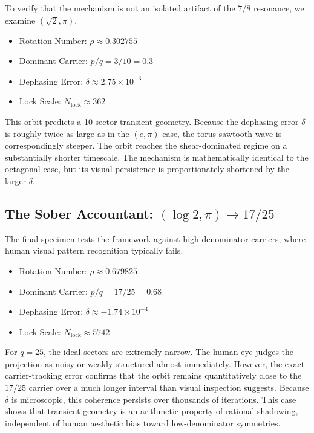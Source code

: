\documentclass[11pt]{article}
\begin{document}
To verify that the mechanism is not an isolated artifact of the $7/8$ resonance, we examine $(\sqrt{2},\pi)$.
\begin{itemize}
    \item Rotation Number: $\rho \approx 0.302755$
    \item Dominant Carrier: $p/q = 3/10 = 0.3$
    \item Dephasing Error: $\delta \approx 2.75\times 10^{-3}$
    \item Lock Scale: $N_{\mathrm{lock}} \approx 362$
\end{itemize}

This orbit predicts a 10-sector transient geometry. Because the dephasing error $\delta$ is roughly twice as large as in the $(e,\pi)$ case, the torus-sawtooth wave is correspondingly steeper. The orbit reaches the shear-dominated regime on a substantially shorter timescale. The mechanism is mathematically identical to the octagonal case, but its visual persistence is proportionately shortened by the larger $\delta$.

\subsection{The Sober Accountant: $(\log 2,\pi)\to 17/25$}

The final specimen tests the framework against high-denominator carriers, where human visual pattern recognition typically fails.
\begin{itemize}
    \item Rotation Number: $\rho \approx 0.679825$
    \item Dominant Carrier: $p/q = 17/25 = 0.68$
    \item Dephasing Error: $\delta \approx -1.74\times 10^{-4}$
    \item Lock Scale: $N_{\mathrm{lock}} \approx 5742$
\end{itemize}

For $q=25$, the ideal sectors are extremely narrow. The human eye judges the projection as noisy or weakly structured almost immediately. However, the exact carrier-tracking error confirms that the orbit remains quantitatively close to the $17/25$ carrier over a much longer interval than visual inspection suggests. Because $\delta$ is microscopic, this coherence persists over thousands of iterations. This case shows that transient geometry is an arithmetic property of rational shadowing, independent of human aesthetic bias toward low-denominator symmetries.
\end{document}
